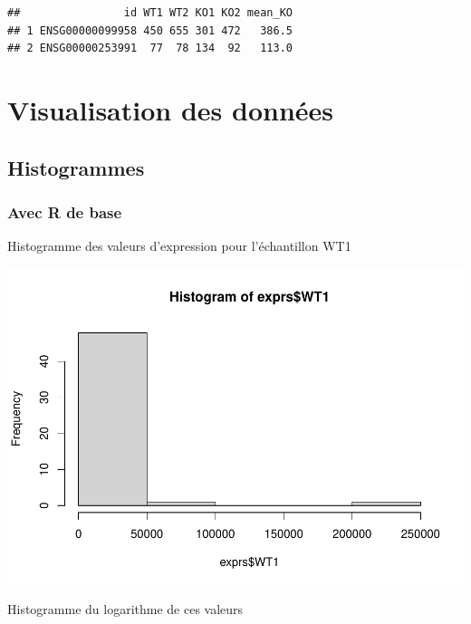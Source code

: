 \documentclass[
]{book}
\newenvironment{Shaded}{\begin{snugshade}}{\end{snugshade}}
\newcommand{\FunctionTok}[1]{\textcolor[rgb]{0.00,0.00,0.00}{#1}}
\newcommand{\NormalTok}[1]{#1}
\newcommand{\SpecialCharTok}[1]{\textcolor[rgb]{0.00,0.00,0.00}{#1}}
\begin{document}
\begin{verbatim}
##                id WT1 WT2 KO1 KO2 mean_KO
## 1 ENSG00000099958 450 655 301 472   386.5
## 2 ENSG00000253991  77  78 134  92   113.0
\end{verbatim}

\hypertarget{visualisation-des-donnuxe9es}{%
\chapter{Visualisation des données}\label{visualisation-des-donnuxe9es}}

\hypertarget{histogrammes}{%
\section{Histogrammes}\label{histogrammes}}

\hypertarget{avec-r-de-base}{%
\subsection{Avec R de base}\label{avec-r-de-base}}

Histogramme des valeurs d'expression pour l'échantillon WT1

\begin{Shaded}
\end{Shaded}

\includegraphics{images/unnamed-chunk-72-1.pdf}

Histogramme du logarithme de ces valeurs
\end{document}
